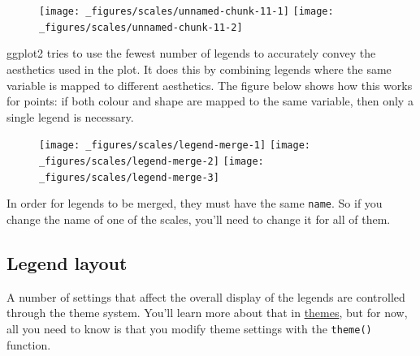\begin{figure}[H]
  \texttt{[image: \_figures/scales/unnamed-chunk-11-1]}%
  \texttt{[image: \_figures/scales/unnamed-chunk-11-2]}
\end{figure}

ggplot2 tries to use the fewest number of legends to accurately convey
the aesthetics used in the plot. It does this by combining legends where
the same variable is mapped to different aesthetics. The figure below
shows how this works for points: if both colour and shape are mapped to
the same variable, then only a single legend is necessary.

\begin{Shaded}
\begin{Highlighting}[]
\StringTok{ }\NormalTok{(}\NormalTok{(} 
\StringTok{ }\NormalTok{(}\NormalTok{(} 
\StringTok{ }\NormalTok{(}\NormalTok{(}  
\end{Highlighting}
\end{Shaded}

\begin{figure}[H]
  \texttt{[image: \_figures/scales/legend-merge-1]}%
  \texttt{[image: \_figures/scales/legend-merge-2]}%
  \texttt{[image: \_figures/scales/legend-merge-3]}
\end{figure}

In order for legends to be merged, they must have the same
\texttt{name}. So if you change the name of one of the scales, you'll
need to change it for all of them.

\subsection{Legend layout}\label{sub:legend-layout}

A number of settings that affect the overall display of the legends are
controlled through the theme system. You'll learn more about that in
\hyperref[sec:themes]{themes}, but for now, all you need to know is that
you modify theme settings with the \texttt{theme()} function.

